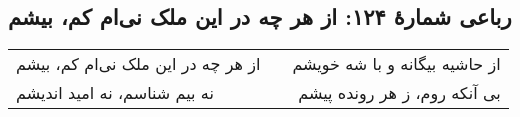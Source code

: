 \begin{center}
\section*{رباعی شمارهٔ ۱۲۴: از هر چه در این ملک نی‌ام کم، بیشم}
\label{sec:124}
\begin{longtable}{l p{0.5cm} r}
از هر چه در این ملک نی‌ام کم، بیشم
&&
از حاشیه بیگانه و با شه خویشم
\\
نه بیم شناسم، نه امید اندیشم
&&
بی آنکه روم، ز هر رونده پیشم 
\\
\end{longtable}
\end{center}
